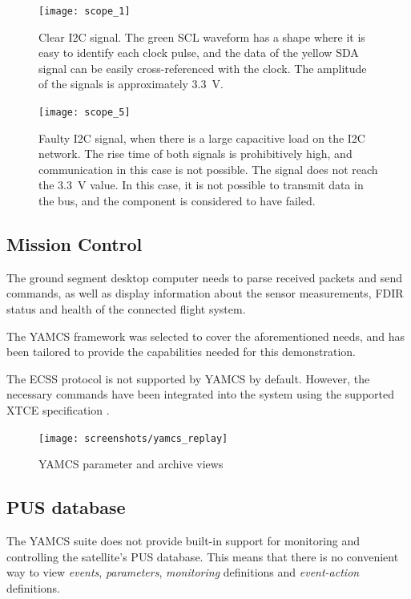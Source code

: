 \documentclass[a4paper,nobib]{tufte-book}
\begin{document}
\begin{figure}[h]
	\texttt{[image: scope\_1]}
	\label{subfig:i2c_clean}
	\caption[Clear I2C signal]{Clear \acs{I2C} signal. The green \acs{SCL} waveform has a shape where it is easy to identify each clock pulse, and the data of the yellow \acs{SDA} signal can be easily cross-referenced with the clock. The amplitude of the signals is approximately \SI{3.3}{\volt}.}
\end{figure}

\begin{figure}[h]
	\texttt{[image: scope\_5]}
	\caption[Faulty I2C signal]{Faulty \acs{I2C} signal, when there is a large capacitive load on the \acs{I2C} network. The rise time of both signals is prohibitively high, and communication in this case is not possible. The signal does not reach the \SI{3.3}{\volt} value. In this case, it is not possible to transmit data in the bus, and the component is considered to have failed.}
	\label{subfig:i2c_dirty}
\end{figure}

\FloatBarrier

\subsection{Mission Control}

The ground segment desktop computer needs to parse received packets and send commands, as well as display information about the sensor measurements, \ac{FDIR} status and health of the connected flight system.

The \acs{YAMCS} \autocite{sela_yamcs_lightweight_2012} framework was selected to cover the aforementioned needs, and has been tailored to provide the capabilities needed for this demonstration.

The \ac{ECSS} protocol \autocite{ECSS-E-ST-70-41C} is not supported by \acs{YAMCS} by default. However, the necessary commands have been integrated into the system using the supported \ac{XTCE} specification \autocite{simon_xtce_standard_2004}.

\begin{figure}[h]
	\texttt{[image: screenshots/yamcs\_replay]}
	\caption{\acs{YAMCS} parameter and archive views}
\end{figure}

\subsection{\acs{PUS} database}
\label{sec:pusinterface}
The \acs{YAMCS} suite does not provide built-in support for monitoring and controlling the satellite's \acs{PUS} database. This means that there is no convenient way to view \emph{events}, \emph{parameters}, \emph{monitoring} definitions and \emph{event-action} definitions.
\end{document}
